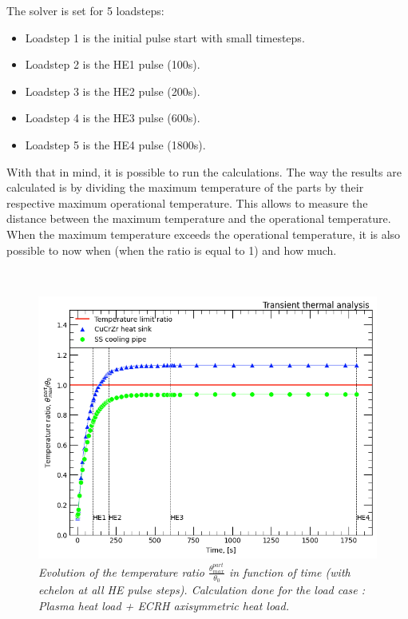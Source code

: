 \normalsize{\indent The solver is set for 5 loadsteps:
\begin{itemize}
    \item Loadstep 1 is the initial pulse start with small timesteps.
    \item Loadstep 2 is the HE1 pulse (100s).
    \item Loadstep 3 is the HE2 pulse (200s).
    \item Loadstep 4 is the HE3 pulse (600s).
    \item Loadstep 5 is the HE4 pulse (1800s).
\end{itemize}
With that in mind, it is possible to run the calculations. The way the results are calculated is by dividing the maximum temperature of the parts by their respective maximum operational temperature. This allows to measure the distance between the maximum temperature and the operational temperature. When the maximum temperature exceeds the operational temperature, it is also possible to now when (when the ratio is equal to 1) and how much.}
\\
\begin{figure}[!ht]
    \label{fig_5_13} 
    \centering
    \includegraphics[width=1\textwidth]{figures/AllHEPulsesTRatio.png}
    \caption{\it Evolution of the temperature ratio $\frac{\theta^{part}_{max}}{\theta_0}$ in function of time (with echelon at all HE pulse steps). Calculation done for the load case : Plasma heat load + \acrshort{ECRH} axisymmetric heat load.}
\end{figure}
\\
